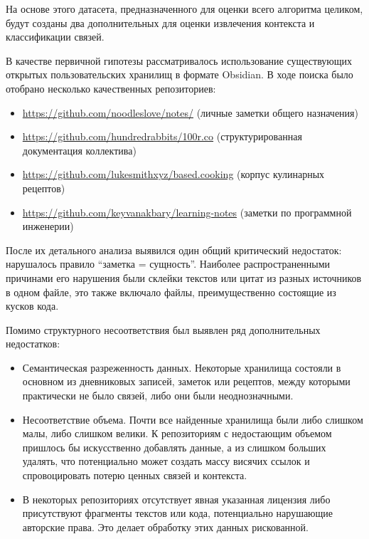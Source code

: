 На основе этого датасета, предназначенного для оценки всего алгоритма целиком,
будут созданы два дополнительных для оценки извлечения контекста и классификации связей.

В качестве первичной гипотезы рассматривалось использование существующих открытых
пользовательских хранилищ в формате Obsidian.
В ходе поиска было отобрано несколько качественных репозиториев:
\begin{itemize}
      \item \url{https://github.com/noodleslove/notes/} (личные заметки общего назначения)
      \item \url{https://github.com/hundredrabbits/100r.co} (структурированная документация коллектива)
      \item \url{https://github.com/lukesmithxyz/based.cooking} (корпус кулинарных рецептов)
      \item \url{https://github.com/keyvanakbary/learning-notes} (заметки по программной инженерии)
\end{itemize}

После их детального анализа выявился один общий критический недостаток:
нарушалось правило ``заметка = сущность''.
Наиболее распространенными причинами его нарушения были
склейки текстов или цитат из разных источников в одном файле,
это также включало файлы, преимущественно состоящие из кусков кода.

Помимо структурного несоответствия был выявлен ряд дополнительных недостатков:
\begin{itemize}
      \item Семантическая разреженность данных.
            Некоторые хранилища состояли в основном из дневниковых записей, заметок или рецептов,
            между которыми практически не было связей, либо они были неоднозначными.
      \item Несоответствие объема.
            Почти все найденные хранилища были либо слишком малы, либо слишком велики.
            К репозиториям с недостающим объемом пришлось бы искусственно добавлять данные, а из
            слишком больших удалять,
            что потенциально может создать массу висячих ссылок и
            спровоцировать потерю ценных связей и контекста.
      \item В некоторых репозиториях отсутствует явная указанная лицензия
            либо присутствуют фрагменты текстов или кода,
            потенциально нарушающие авторские права.
            Это делает обработку этих данных рискованной.
\end{itemize}

